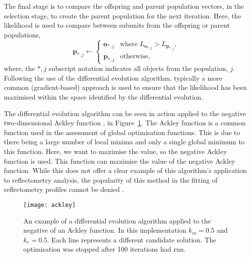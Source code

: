 \documentclass[
 reprint,
 superscriptaddress,
 amsmath,amssymb,
 aps,
]{revtex4-1}
\begin{document}
The final stage is to compare the offspring and parent population vectors, in the selection stage, to create the parent population for the next iteration.
Here, the likelihood is used to compare between subunits from the offspring or parent populations,
%
\begin{equation}
    \mathbf{p}_{*, j} \leftarrow
    \begin{cases}
        \mathbf{o}_{*, j} & \text{where } L_{\mathbf{o}_{*, j}} > L_{\mathbf{p}_{*, j}},\\
        \mathbf{p}_{*, j} & \text{otherwise},
    \end{cases}
\end{equation}
%
where, the $*, j$ subscript notation indicates all objects from the population, $j$.
Following the use of the differential evolution algorithm, typically a more common (gradient-based) approach is used to ensure that the likelihood has been maximised within the space identified by the differential evolution.

The differential evolution algorithm can be seen in action applied to the negative two-dimensional Ackley function \cite{ackley_connectionist_1987}, in Figure~\ref{fig:ackley}.
The Ackley function is a common function used in the assessment of global optimisation functions. This is due to there being a large number of local minima and only a single global minimum to this function. Here, we want to maximise the value, so the negative Ackley function is used.
This function can maximise the value of the negative Ackley function.
While this does not offer a clear example of this algorithm's application to reflectometry analysis, the popularity of this method in the fitting of reflectometry profiles cannot be denied \cite{bjorck_fitting_2011,nelson_refnx_2019}.
%
\begin{figure}[t]
    \texttt{[image: ackley]}
    \caption{An example of a differential evolution algorithm applied to the negative of an Ackley function. In this implementation $k_m=0.5$ and $k_r=0.5$. Each line represents a different candidate solution. The optimisation was stopped after 100 iterations had run.}
    \label{fig:ackley}
\end{figure}
%
\end{document}
